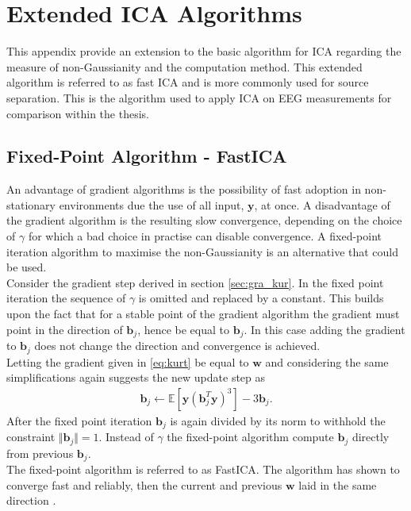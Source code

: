 \chapter{Extended ICA Algorithms}\label{app:ICA}
This appendix provide an extension to the basic algorithm for ICA regarding the measure of non-Gaussianity and the computation method. This extended algorithm is referred to as fast ICA and is more commonly used for source separation. This is the algorithm used to apply ICA on EEG measurements for comparison within the thesis.        

\section{Fixed-Point Algorithm - FastICA}
An advantage of gradient algorithms is the possibility of fast adoption in non-stationary environments due the use of all input, $\textbf{y}$, at once. A disadvantage of the gradient algorithm is the resulting slow convergence, depending on the choice of $\gamma$ for which a bad choice in practise can disable convergence. A fixed-point iteration algorithm to maximise the non-Gaussianity is an alternative that could be used.\\
Consider the gradient step derived in section \ref{sec:gra_kur}.
In the fixed point iteration the sequence of $\gamma$ is omitted and replaced by a constant. This builds upon the fact that for a stable point of the gradient algorithm the gradient must point in the direction of $\textbf{b}_j$, hence be equal to $\textbf{b}_j$. In this case adding the gradient to $\textbf{b}_j$ does not change the direction and convergence is achieved.\\    
Letting the gradient given in \eqref{eq:kurt} be equal to $\mathbf{w}$ and  considering the same simplifications again
suggests the new update step as \cite[p. 179]{ICA}
\begin{align*}
\mathbf{b}_j \gets \mathbb{E}[\mathbf{y}(\textbf{b}_{j}^T \textbf{y})^3] - 3 \mathbf{b}_j.
\end{align*}
After the fixed point iteration $\textbf{b}_j$ is again divided by its norm to withhold the constraint $\Vert \textbf{b}_j \Vert = 1$.   
Instead of $\gamma$ the fixed-point algorithm compute $\mathbf{b}_j$ directly from previous $\mathbf{b}_j$.\\
The fixed-point algorithm is referred to as FastICA. The algorithm has shown to converge fast and reliably, then the current and previous $\mathbf{w}$ laid in the same direction \cite[p. 179]{ICA}. 


